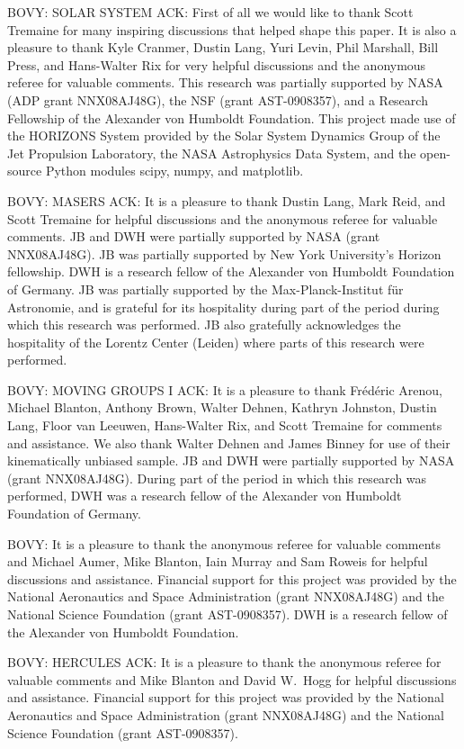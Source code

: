 BOVY: SOLAR SYSTEM ACK: First of all we would like to thank Scott
Tremaine for many inspiring discussions that helped shape this
paper. It is also a pleasure to thank Kyle Cranmer, Dustin Lang, Yuri
Levin, Phil Marshall, Bill Press, and Hans-Walter Rix for very helpful
discussions and the anonymous referee for valuable comments. This
research was partially supported by NASA (ADP grant NNX08AJ48G), the
NSF (grant AST-0908357), and a Research Fellowship of the Alexander
von Humboldt Foundation. This project made use of the HORIZONS System
provided by the Solar System Dynamics Group of the Jet Propulsion
Laboratory, the NASA Astrophysics Data System, and the open-source
Python modules scipy, numpy, and matplotlib.

BOVY: MASERS ACK: It is a pleasure to thank Dustin Lang, Mark Reid,
and Scott Tremaine for helpful discussions and the anonymous referee
for valuable comments. JB and DWH were partially supported by NASA
(grant NNX08AJ48G). JB was partially supported by New York
University's Horizon fellowship. DWH is a research fellow of the
Alexander von Humboldt Foundation of Germany. JB was partially
supported by the Max-Planck-Institut f\"ur Astronomie, and is grateful
for its hospitality during part of the period during which this
research was performed. JB also gratefully acknowledges the
hospitality of the Lorentz Center (Leiden) where parts of this
research were performed.

BOVY: MOVING GROUPS I ACK: It is a pleasure to thank Fr{\'e}d{\'e}ric
Arenou, Michael Blanton, Anthony Brown, Walter Dehnen, Kathryn
Johnston, Dustin Lang, Floor van Leeuwen, Hans-Walter Rix, and Scott
Tremaine for comments and assistance. We also thank Walter Dehnen and
James Binney for use of their kinematically unbiased sample. JB and
DWH were partially supported by NASA (grant NNX08AJ48G). During part
of the period in which this research was performed, DWH was a research
fellow of the Alexander von Humboldt Foundation of Germany.


BOVY: It is a pleasure to thank the anonymous referee for valuable
comments and Michael Aumer, Mike Blanton, Iain Murray and Sam Roweis
for helpful discussions and assistance.  Financial support for this
project was provided by the National Aeronautics and Space
Administration (grant NNX08AJ48G) and the National Science Foundation
(grant AST-0908357). DWH is a research fellow of the Alexander von
Humboldt Foundation.


BOVY: HERCULES ACK: It is a pleasure to thank the anonymous referee
for valuable comments and Mike Blanton and David W.~Hogg for helpful
discussions and assistance.  Financial support for this project was
provided by the National Aeronautics and Space Administration (grant
NNX08AJ48G) and the National Science Foundation (grant AST-0908357).



